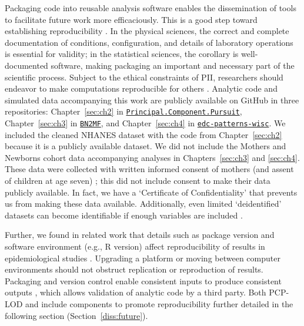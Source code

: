 Packaging code into reusable analysis software enables the dissemination of tools to facilitate future work more efficaciously. This is a good step toward establishing reproducibility \citep{collberg2015repeatability}. In the physical sciences, the correct and complete documentation of conditions, configuration, and details of laboratory operations is essential for validity; in the statistical sciences, the corollary is well-documented software, making packaging an important and necessary part of the scientific process. Subject to the ethical constraints of PII, researchers should endeavor to make computations reproducible for others \citep{barnes2010publish}. Analytic code and simulated data accompanying this work are publicly available on GitHub in three repositories: Chapter~\ref{sec:ch2} in \texttt{\href{https://github.com/lizzyagibson/Principal.Component.Pursuit}{Principal.Component.Pursuit}}, Chapter~\ref{sec:ch3} in \texttt{\href{https://github.com/lizzyagibson/BN2MF}{BN2MF}}, and Chapter~\ref{sec:ch4} in \texttt{\href{https://github.com/lizzyagibson/edc-patterns-wisc}{edc-patterns-wisc}}. We included the cleaned NHANES dataset with the code from Chapter~\ref{sec:ch2} because it is a publicly available dataset. We did not include the Mothers and Newborns cohort data accompanying analyses in Chapters~\ref{sec:ch3} and \ref{sec:ch4}. These data were collected with written informed consent of mothers (and assent of children at age seven) \citep{perera03}; this did not include consent to make their data publicly available. In fact, we have a `Certificate of Confidentiality' that prevents us from making these data available. Additionally, even limited `deidentified' datasets can become identifiable if enough variables are included \citep{narayanan2008robust}.

Further, we found in related work that details such as package version and software environment (e.g., R version) affect reproducibility of results in epidemiological studies \citep{nunez2020reflection}. Upgrading a platform or moving between computer environments should not obstruct replication or reproduction of results. Packaging and version control enable consistent inputs to produce consistent outputs \citep{wilson2014best}, which allows validation of analytic code by a third party. Both PCP-LOD and \bnmf include components to promote reproducibility further detailed in the following section (Section~\ref{diss:future}).

